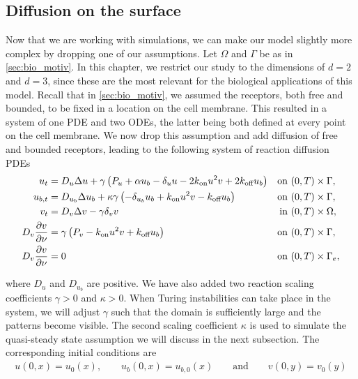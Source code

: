 \subsection{Diffusion on the surface}

Now that we are working with simulations, we can make our model slightly more complex by dropping one of our assumptions. Let $\Omega$ and $\Gamma$ be as in \cref{sec:bio_motiv}. In this chapter, we restrict our study to the dimensions of $d = 2$ and $d = 3$, since these are the most relevant for the biological applications of this model. Recall that in \cref{sec:bio_motiv}, we assumed the receptors, both free and bounded, to be fixed in a location on the cell membrane. This resulted in a system of one PDE and two ODEs, the latter being both defined at every point on the cell membrane. We now drop this assumption and add diffusion of free and bounded receptors, leading to the following system of reaction diffusion PDEs
%
\begin{equation}
    \label{eq:threespeciesmodel}
    \begin{aligned}
    u_t &= D_u \Delta u + \gamma \left( P_u + \alpha u_b - \delta_u u - 2 \kon u^2 v + 2 \koff u_b \right) & \text{on } &(0, T) \times \Gamma, \\
    u_{b,t} &= D_{u_b} \Delta u_b + \kappa \gamma \left( - \delta_{u_b} u_b + \kon u^2 v - \koff u_b \right) & \text{on } &(0, T) \times \Gamma, \\
    v_t &= D_v \Delta v - \gamma \delta_v v & \text{in } &(0, T) \times \Omega, \\
    D_v \pderiv[v]{\nu} &= \gamma \left( P_v - \kon u^2 v + \koff u_b \right) & \text{on } &(0, T) \times \Gamma, \\
    D_v \pderiv[v]{\nu} &= 0 & \text{on } &(0, T) \times \Gamma_e, \\
\end{aligned}
\end{equation}

\noindent
where $D_u$ and $D_{u_b}$ are positive. We have also added two reaction scaling coefficients $\gamma > 0$ and $\kappa > 0$. When Turing instabilities can take place in the system, we will adjust $\gamma$ such that the domain is sufficiently large and the patterns become visible. The second scaling coefficient $\kappa$ is used to simulate the quasi-steady state assumption we will discuss in the next subsection. The corresponding initial conditions are
%
\begin{equation*}
\begin{aligned}
    u(0, x) = u_0(x), \qquad u_b(0, x) = u_{b,0}(x) \qquad \text{and} \qquad v(0, y) = v_0(y)
\end{aligned}
\end{equation*}


